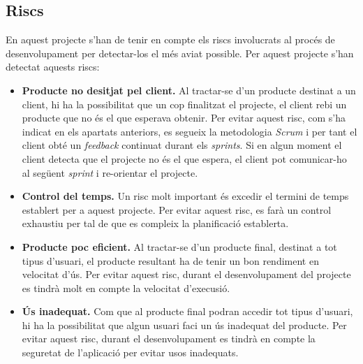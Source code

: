 \subsection{Riscs}

En aquest projecte s'han de tenir en compte els riscs involucrats al procés de desenvolupament per detectar-los el més aviat possible. Per aquest projecte s'han detectat aquests riscs:

\begin{itemize}
    \item \textbf{Producte no desitjat pel client.} Al tractar-se d'un producte destinat a un client, hi ha la possibilitat que un cop finalitzat el projecte, el client rebi un producte que no és el que esperava obtenir. Per evitar aquest risc, com s'ha indicat en els apartats anteriors, es segueix la metodologia \textit{Scrum} i per tant el client obté un \textit{feedback} continuat durant els \textit{sprints}. Si en algun moment el client detecta que el projecte no és el que espera, el client pot comunicar-ho al següent \textit{sprint} i re-orientar el projecte.
    \item \textbf{Control del temps.} Un risc molt important és excedir el termini de temps establert per a aquest projecte. Per evitar aquest risc, es farà un control exhaustiu per tal de que es compleix la planificació establerta.
    \item \textbf{Producte poc eficient.} Al tractar-se d'un producte final, destinat a tot tipus d'usuari, el producte resultant ha de tenir un bon rendiment en velocitat d'ús. Per evitar aquest risc, durant el desenvolupament del projecte es tindrà molt en compte la velocitat d'execusió.
    \item \textbf{Ús inadequat.} Com que al producte final podran accedir tot tipus d'usuari, hi ha la possibilitat que algun usuari faci un ús inadequat del producte. Per evitar aquest risc, durant el desenvolupament es tindrà en compte la seguretat de l'aplicació per evitar usos inadequats.
\end{itemize}                                    